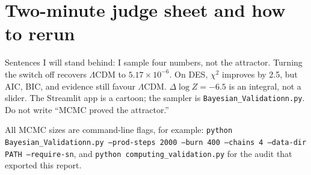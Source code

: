 \documentclass[12pt,letterpaper]{article}
\begin{document}
\appendix
\section{Two-minute judge sheet and how to rerun}

Sentences I will stand behind: I sample four numbers, not the attractor.
Turning the switch off recovers $\Lambda$CDM to $5.17\times 10^{-6}$.
On DES, $\chi^2$ improves by 2.5, but AIC, BIC, and evidence still favour
$\Lambda$CDM. $\Delta\log Z=-6.5$ is an integral, not a slider. The
Streamlit app is a cartoon; the sampler is
\texttt{Bayesian\_Validationn.py}. Do not write ``MCMC proved the
attractor.''

All MCMC sizes are command-line flags, for example:
\texttt{python Bayesian\_Validationn.py --prod-steps 2000 --burn 400
--chains 4 --data-dir PATH --require-sn}, and
\texttt{python computing\_validation.py} for the audit that exported
this report.
\end{document}
